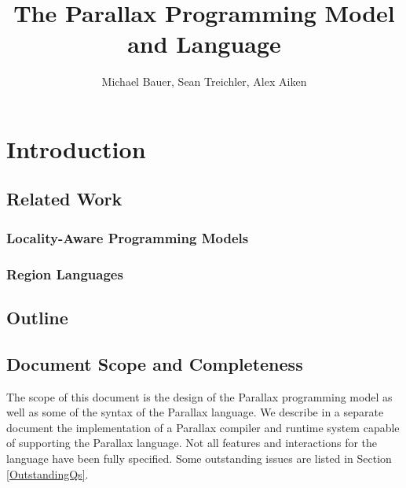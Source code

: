 \documentclass{article}
\title{The Parallax Programming Model and Language}
\author{Michael Bauer, Sean Treichler, Alex Aiken}
\theoremstyle{definition}
\begin{document}
\maketitle
\pagebreak

\tableofcontents
\pagebreak


\section{Introduction \label{Intro}}

\subsection{Related Work \label{Related}}

\subsubsection{Locality-Aware Programming Models \label{LocalityAware}}

\subsubsection{Region Languages \label{RegionLangs}}

\subsection{Outline \label{Outline}}

\subsection{Document Scope and Completeness \label{Scope} }
The scope of this document is the design of the Parallax programming model
as well as some of the syntax of the Parallax language.  We describe in a 
separate document the implementation of a Parallax compiler and runtime system
capable of supporting the Parallax language.  Not all features and interactions
for the language have been fully specified.  Some outstanding issues are listed
in Section \ref{OutstandingQs}.

\pagebreak
\end{document}
